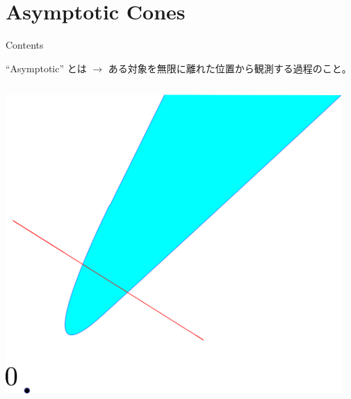 \documentclass[aspectratio=169, dvipdfmx, 11pt]{beamer} %
\begin{document}
\section{Asymptotic Cones}
\begin{frame}{Contents}
  \tableofcontents[currentsection]
\end{frame}

\begin{frame}{``Asymptotic'' とは}
  \pause
  $\rightarrow$ ある対象を無限に離れた位置から観測する過程のこと。

  \medskip

  \centering
    \begin{columns}
      \pause
      \begin{column}{0.48\textwidth}
      \centering
      \includegraphics[keepaspectratio, scale=0.095]{figures/asymptotic_meaning_1.eps}
      \end{column}
      \pause
      \begin{column}{0.48\textwidth}
      \centering

\end{column}
\end{columns}
\end{frame}
\end{document}
